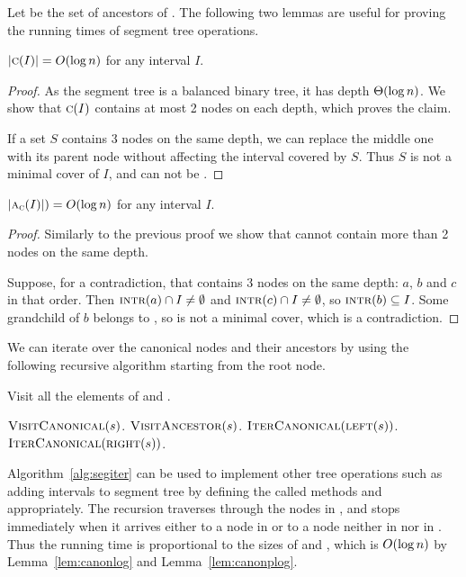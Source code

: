\documentclass[english,gradu]{tktltiki2018}
\begin{document}
Let  be the set of ancestors of .
The following two lemmas are useful for proving the running times of segment tree operations.

\begin{lem}\label{lem:canonlog}$\left |\textsc{c}(I)\right |=O(\log n)$ for any interval $I$.\end{lem}
\begin{proof}
As the segment tree is a balanced binary tree, it has depth $\Theta(\log n)$.
We show that $\textsc{c}(I)$ contains at most 2 nodes on each depth, which proves the claim.

If a set $S$ contains 3 nodes on the same depth, we can replace the middle one with its parent node without affecting the interval covered by $S$.
Thus $S$ is not a minimal cover of $I$, and can not be .
\end{proof}

\begin{lem}\label{lem:canonplog}$\left |\textsc{a}_{\textsc{c}}(I)\right |)=O(\log n)$ for any interval $I$.\end{lem}
\begin{proof}
Similarly to the previous proof we show that  cannot contain more than 2 nodes on the same depth.

Suppose, for a contradiction, that  contains 3 nodes on the same depth: $a$, $b$ and $c$ in that order.
Then $\textsc{intr}(a)\cap I\neq\emptyset$ and $\textsc{intr}(c)\cap I\neq\emptyset$, so $\textsc{intr}(b)\subseteq I$.
Some grandchild of $b$ belongs to , so  is not a minimal cover, which is a contradiction.
\end{proof}

We can iterate over the canonical nodes and their ancestors by using the following recursive algorithm starting from the root node.

\begin{alg}\label{alg:segiter}
Visit all the elements of  and .
\begin{algorithmic}
		\State $\textsc{VisitCanonical}(s)$.
		\State $\textsc{VisitAncestor}(s)$.
		\State $\textsc{IterCanonical}(\textsc{left}(s))$.
		\State $\textsc{IterCanonical}(\textsc{right}(s))$.
	\EndIf
\EndProcedure
\end{algorithmic}
\end{alg}

Algorithm~\ref{alg:segiter} can be used to implement other tree operations such as adding intervals to segment tree by defining the called methods \visitc and \visitp appropriately.
The recursion traverses through the nodes in , and stops immediately when it arrives either to a node in  or to a node neither in  nor in .
Thus the running time is proportional to the sizes of  and , which is $O(\log n)$ by Lemma~\ref{lem:canonlog} and Lemma~\ref{lem:canonplog}.
\end{document}
